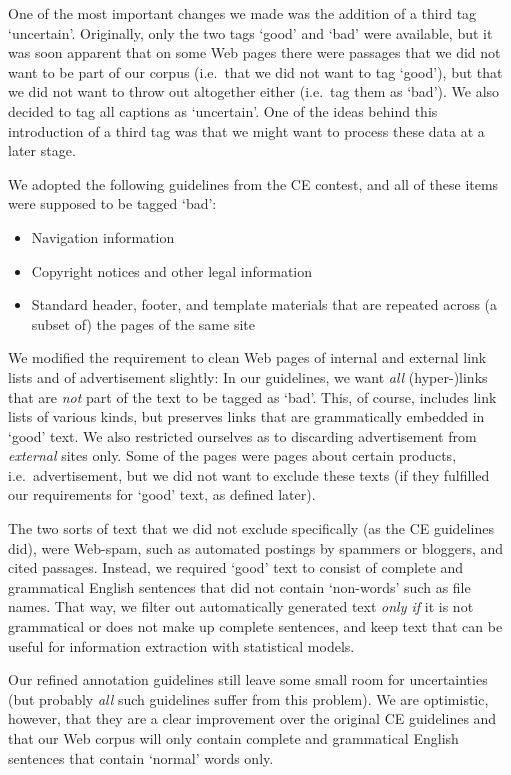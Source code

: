 \documentclass[12pt]{article}
\begin{document}
One of the most important changes we made was the addition of a third tag `uncertain'. Originally, only the two tags `good' and `bad' were available, but it was soon apparent that on some Web pages there were passages that we did not want to be part of our corpus (i.e.~that we did not want to tag `good'), but that we did not want to throw out altogether either (i.e.~tag them as `bad'). We also decided to tag all captions as `uncertain'. One of the ideas behind this introduction of a third tag was that we might want to process these data at a later stage.

We adopted the following guidelines from the CE contest, and all of these items were supposed to be tagged `bad':

\begin{itemize}
	\item Navigation information
	\item Copyright notices and other legal information
	\item Standard header, footer, and template materials that are repeated across (a subset of) the pages of the same site
\end{itemize}

We modified the requirement to clean Web pages of internal and external link lists and of advertisement slightly: In our guidelines, we want \textit{all} \mbox{(hyper-)links} that are \textit{not} part of the text to be tagged as `bad'. This, of course, includes link lists of various kinds, but preserves links that are grammatically embedded in `good' text. We also restricted ourselves as to discarding advertisement from \textit{external} sites only. Some of the pages were pages about certain products, i.e.~advertisement, but we did not want to exclude these texts (if they fulfilled our requirements for `good' text, as defined later).

The two sorts of text that we did not exclude specifically (as the CE guidelines did), were Web-spam, such as automated postings by spammers or bloggers, and cited passages. Instead, we required `good' text to consist of complete and grammatical English sentences that did not contain `non-words' such as file names. That way, we filter out automatically generated text \textit{only if} it is not grammatical or does not make up complete sentences, and keep text that can be useful for information extraction with statistical models.

Our refined annotation guidelines still leave some small room for uncertainties (but probably \textit{all} such guidelines suffer from this problem). We are optimistic, however, that they are a clear improvement over the original CE guidelines and that our Web corpus will only contain complete and grammatical English sentences that contain `normal' words only.
\end{document}
